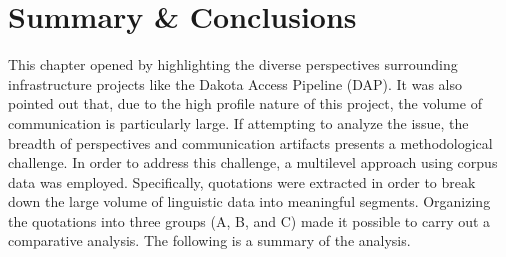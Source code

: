 \section{Summary \& Conclusions}

This chapter opened by highlighting the diverse perspectives surrounding infrastructure projects like the Dakota Access Pipeline (DAP). It was also pointed out that, due to the high profile nature of this project, the volume of communication is particularly large. If attempting to analyze the issue, the breadth of perspectives and communication artifacts presents a methodological challenge. In order to address this challenge, a multilevel approach using corpus data was employed. Specifically, quotations were extracted in order to break down the large volume of linguistic data into meaningful segments. Organizing the quotations into three groups (A, B, and C) made it possible to carry out a comparative analysis. The following is a summary of the analysis.

